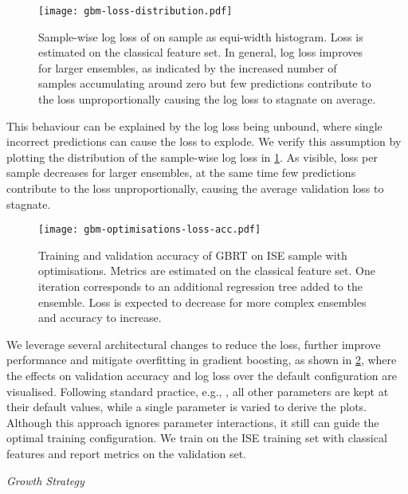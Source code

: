 \begin{figure}[ht]
    \centering
    \texttt{[image: gbm-loss-distribution.pdf]}
    \caption[Sample-Wise Log Loss of Gradient-Boosting]{Sample-wise log loss of  on  sample as equi-width histogram. Loss is estimated on the classical feature set. In general, log loss improves for larger ensembles, as indicated by the increased number of samples accumulating around zero but few predictions contribute to the loss unproportionally causing the log loss to stagnate on average.}
    \label{fig:gbm-loss-distribution}
\end{figure}

This behaviour can be explained by the log loss being unbound, where single incorrect predictions can cause the loss to explode. We verify this assumption by plotting the distribution of the sample-wise log loss in \cref{fig:gbm-loss-distribution}. As visible, loss per sample decreases for larger ensembles, at the same time few predictions contribute to the loss unproportionally, causing the average validation loss to stagnate.

\begin{figure}[ht]
    \centering
    \texttt{[image: gbm-optimisations-loss-acc.pdf]}
    \caption[Training and Validation Accuracy of  with Optimisations]{Training and validation accuracy of \gls{GBRT} on \gls{ISE} sample with optimisations. Metrics are estimated on the classical feature set. One iteration corresponds to an additional regression tree added to the ensemble. Loss is expected to decrease for more complex ensembles and accuracy to increase.}
    \label{fig:gbm-optimisations-loss-acc}
\end{figure}

We leverage several architectural changes to reduce the loss, further improve performance and mitigate overfitting in gradient boosting, as shown in \cref{fig:gbm-optimisations-loss-acc}, where the effects on validation accuracy and log loss over the default configuration are visualised. Following standard practice, e.g., \textcite{tuningplaybookgithub}, all other parameters are kept at their default values, while a single parameter is varied to derive the plots. Although this approach ignores parameter interactions, it still can guide the optimal training configuration. We train on the ISE training set with classical features and report metrics on the validation set.

\emph{Growth Strategy}

